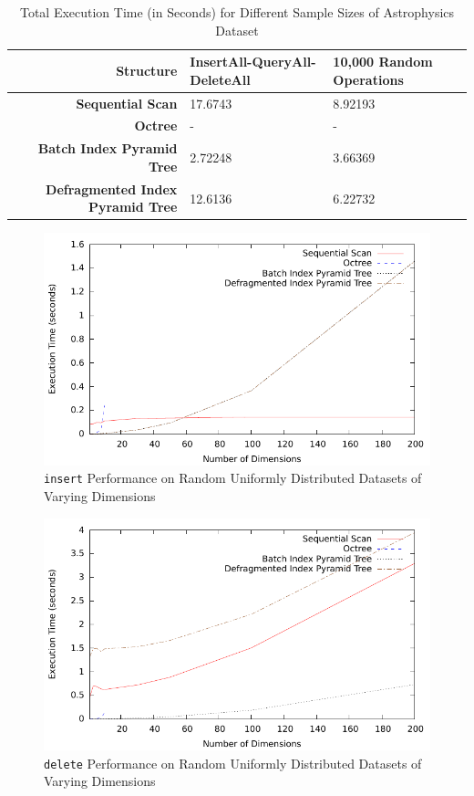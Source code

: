 \begin{landscape}
	\begin{table}
		\centering
		\begin{tabular}{|r|l|l|}
			\hline
			\textbf{Structure} & \textbf{InsertAll-QueryAll-DeleteAll} & \textbf{10,000 Random Operations} \\
			\hline
			\textbf{Sequential Scan} & 17.6743 & 8.92193 \\
			\textbf{Octree} & - & - \\
			\textbf{Batch Index Pyramid Tree} & 2.72248 & 3.66369 \\
			\textbf{Defragmented Index Pyramid Tree} & 12.6136 & 6.22732 \\
			\hline
		\end{tabular}
		\caption{Total Execution Time (in Seconds) for Different Sample Sizes of Astrophysics Dataset}
		\label{tab:perf1-astrophysics}
	\end{table}	

\end{landscape}

\begin{figure}
	\centering
	\includegraphics[scale=0.8]{figures/performance_analysis/iteration_1/all_insert_randuniform.pdf}
	\caption{\texttt{insert} Performance on Random Uniformly Distributed Datasets of Varying Dimensions}
	\label{fig:perf1-allinsert-d}
\end{figure}

\begin{figure}
	\centering
	\includegraphics[scale=0.8]{figures/performance_analysis/iteration_1/all_delete_randuniform.pdf}
	\caption{\texttt{delete} Performance on Random Uniformly Distributed Datasets of Varying Dimensions}
	\label{fig:perf1-alldelete-d}
\end{figure}


